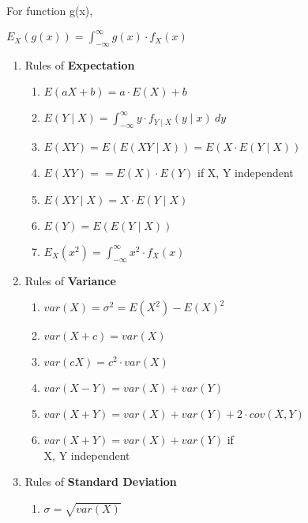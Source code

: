 \documentclass{article}
\begin{document}
\begin{small}
\begin{multicols}{2}
\begin{enumerate}
For function g(x), 

$E_X(g(x)) = \int_{-\infty}^{\infty} g(x) \cdot f_X(x)$

\end{enumerate}

\end{multicols}

\pagebreak


\begin{multicols}{2}
\begin{enumerate}
\item Rules of \textbf{Expectation} 
  \begin{enumerate}
  \item $E(aX + b) = a \cdot E(X) + b$
  \item $E(Y \mid X) = \int_{-\infty}^{\infty} y \cdot f_{Y \mid X}(y \mid x) \ dy$
  \item $E(XY) = E(E(XY \mid X)) = E(X \cdot E(Y \mid X))$
  \item $E(XY) == E(X) \cdot E(Y)$ if X, Y independent
  \item $E(XY \mid X) = X \cdot E(Y \mid X)$
  \item $E(Y) = E(E(Y \mid X))$
  \item $E_X(x^2) = \int_{-\infty}^{\infty} x^2 \cdot f_X(x)$
  \end{enumerate}

\item Rules of \textbf{Variance}
  \begin{enumerate}
  \item $var(X) = \sigma^2 = E(X^2) - E(X)^2$
  \item $var(X + c) = var(X)$
  \item $var(cX) = c^2 \cdot var(X)$
  \item $var(X - Y) = var(X) + var(Y)$
  \item $var(X + Y) = var(X) + var(Y) + 2 \cdot cov(X, Y)$
  \item $var(X + Y) = var(X) + var(Y)$ if\\X, Y independent
  \end{enumerate}

\item Rules of \textbf{Standard Deviation}
  \begin{enumerate}
  \item $\sigma = \sqrt{var(X)}$
  \end{enumerate}


\end{enumerate}
\end{multicols}
\end{small}
\end{document}
